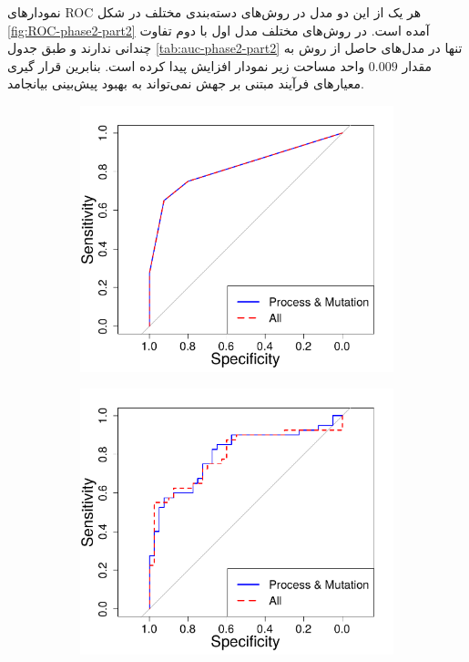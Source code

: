  نمودارهای ROC هر یک از این دو مدل در روش‌های دسته‌بندی مختلف در شکل \ref{fig:ROC-phase2-part2} آمده است. در روش‌های مختلف مدل اول با دوم تفاوت چندانی ندارند و طبق جدول \ref{tab:auc-phase2-part2} تنها در مدل‌های حاصل از روش  به مقدار $0.009$ واحد مساحت زیر نمودار افزایش پیدا  کرده است. بنابرین قرار گیری معیارهای فرآیند مبتنی بر جهش نمی‌تواند به بهبود پیش‌بینی بیانجامد.
\begin{figure}[H]
	\begin{subfigure}{.5\textwidth}
		\centering
		\includegraphics[width=\linewidth]{img/evaluation/phase2-part2-roc-dt.pdf}
		\caption{}
	\end{subfigure}
	\begin{subfigure}{.5\textwidth}
		\centering
		\includegraphics[width=\linewidth]{img/evaluation/phase2-part2-roc-svm.pdf}

\end{subfigure}
\end{figure}
